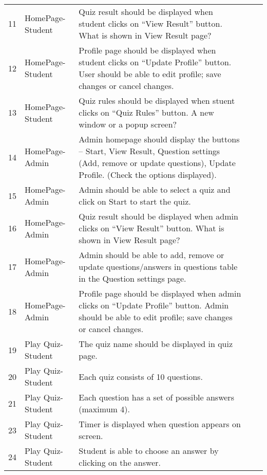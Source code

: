\begin{landscape}
\begin{longtabu}{c l X c c}
11 & HomePage-Student & Quiz result should be displayed when student clicks on
``View Result'' button. What is shown in View Result page? & & \\

12 & HomePage-Student & Profile page should be displayed when student clicks on
``Update Profile'' button. User should be able to edit profile; save changes or
cancel changes. & & \\

13 & HomePage-Student & Quiz rules should be displayed when stuent clicks on
``Quiz Rules'' button. A new window or a popup screen? & & \\

14 & HomePage-Admin & Admin homepage should display the buttons – Start, View
Result, Question settings (Add, remove or update questions), Update Profile.
(Check the options displayed). & & \\

15 & HomePage-Admin & Admin should be able to select a quiz and click on Start
to start the quiz. & & \\

16 & HomePage-Admin & Quiz result should be displayed when admin clicks on
``View Result'' button. What is shown in View Result page? & & \\

17 & HomePage-Admin & Admin should be able to add, remove or update
questions/answers in questions table in the Question settings page. & & \\

18 & HomePage-Admin & Profile page should be displayed when admin clicks on
``Update Profile'' button. Admin should be able to edit profile; save changes or
cancel changes. & & \\

19 & Play Quiz-Student & The quiz name should be displayed in quiz page. & & \\

20 & Play Quiz-Student & Each quiz consists of 10 questions. & & \\

21 & Play Quiz-Student & Each question has a set of possible answers (maximum
4). & & \\

23 & Play Quiz-Student & Timer is displayed when question appears on screen. &
& \\

24 & Play Quiz-Student & Student is able to choose an answer by clicking on the
answer. & & \\


\end{longtabu}
\end{landscape}
